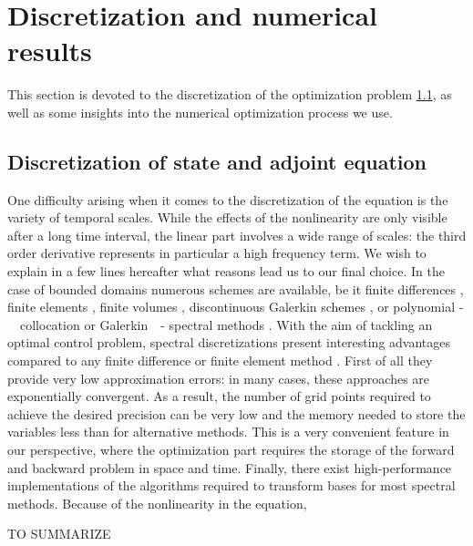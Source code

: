 \section{Discretization and numerical results}
\label{secnum}
This section is devoted to the discretization of the optimization problem \ref{}, as well as some insights into the numerical optimization process we use.
\subsection{Discretization of state and adjoint equation}
One difficulty arising when it comes to the discretization of the \KdVB equation is the variety of temporal scales. While the effects of the nonlinearity are only visible after a long time interval, the linear part involves a wide range of scales: the third order derivative represents in particular a high frequency term. We wish to explain in a few lines hereafter what reasons lead us to our final choice. In the case of bounded domains numerous schemes are available, be it finite differences \cite{djidjeli1995numerical,zabusky1965interaction}, finite elements \cite{winther1980conservative,arnold1982superconvergent}, finite volumes \cite{dutykh2013finite}, discontinuous Galerkin schemes \cite{Bona1986859,yan2002local}, or polynomial -~~collocation or Galerkin~~- spectral methods \cite{ma2000legendre,ma2001optimal,shen2003new}. With the aim of tackling an optimal control problem, spectral discretizations present interesting advantages compared to any finite difference or finite element method \cite{boydchebyshev}. First of all they provide very low approximation errors: in many cases, these approaches are exponentially convergent. As a result, the number of grid points required to achieve the desired precision can be very low and the memory needed to store the variables less than for alternative methods. This is a very convenient feature in our perspective, where the optimization part requires the storage of the forward and backward problem in space and time. Finally, there exist high-performance implementations of the algorithms required to transform bases for most spectral methods. Because of the nonlinearity in the \KdVB equation,


TO SUMMARIZE


